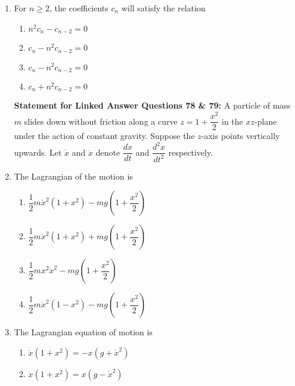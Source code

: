 \documentclass[journal]{IEEEtran}
\numberwithin{equation}{enumi}
\numberwithin{figure}{enumi}
\begin{document}
\begin{enumerate}
\item For $n \geq 2$, the coefficients $c_n$ will satisfy the relation
\hfill{}
\begin{multicols}{2}
    \begin{enumerate}
        \item  $n^2 c_n - c_{n-2} = 0$
        \item $c_n - n^2 c_{n-2} = 0$
        \item $c_n - n^2 c_{n-2} = 0$
        \item $c_n + n^2 c_{n-2} = 0$
    \end{enumerate}
    \end{multicols}

 

\textbf{Statement for Linked Answer Questions 78 \& 79:} 
\newline \vspace{1em}
A particle of mass $m$ slides down without friction along a curve $z = 1 + \dfrac{x^2}{2}$ in the $xz$-plane under the action of constant gravity. Suppose the $z$-axis points vertically upwards. Let $\dot{x}$ and $\ddot{x}$ denote $\dfrac{dx}{dt}$ and $\dfrac{d^2x}{dt^2}$ respectively.

\item The Lagrangian of the motion is      \hfill{}     
\begin{multicols}{2}
    \begin{enumerate}
        \item $\dfrac{1}{2} m \dot{x}^2 (1 + x^2) - mg \left(1 + \dfrac{x^2}{2} \right)$
        \item $\dfrac{1}{2} m \dot{x}^2 (1 + x^2) + mg \left(1 + \dfrac{x^2}{2} \right)$
        \item $\dfrac{1}{2} m x^2 \dot{x}^2 - mg \left(1 + \dfrac{x^2}{2} \right)$
        \item $\dfrac{1}{2} m \dot{x}^2 (1 - x^2) - mg \left(1 + \dfrac{x^2}{2} \right)$
    \end{enumerate}
    \end{multicols}

    
\item The Lagrangian equation of motion is    \hfill{}
\begin{enumerate}
    

    \item $\ddot{x}(1 + x^2) = -x(g + \dot{x}^2)$
    \item $\ddot{x}(1 + x^2) = x(g - \dot{x}^2)$
   

\end{enumerate}
\end{enumerate}
\end{document}
